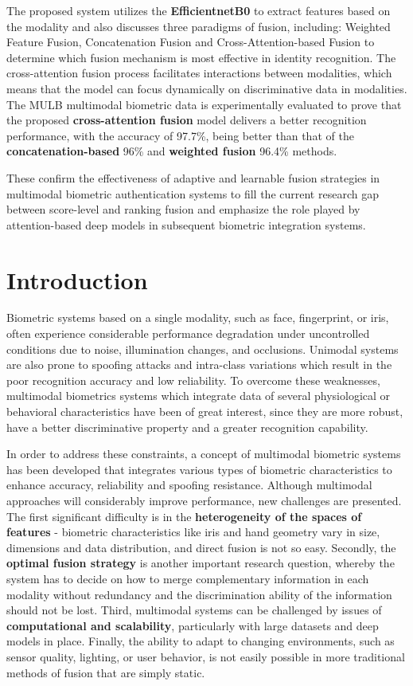\documentclass[12pt,a4paper]{report}
\begin{document}
The proposed system utilizes the \textbf{EfficientnetB0} to extract features based on the modality and also discusses three paradigms of fusion, including: Weighted Feature Fusion, Concatenation Fusion and Cross-Attention-based Fusion to determine which fusion mechanism is most effective in identity recognition. The cross-attention fusion process facilitates interactions between modalities, which means that the model can focus dynamically on discriminative data in modalities. The MULB multimodal biometric data is experimentally evaluated to prove that the proposed \textbf{cross-attention fusion} model delivers a better recognition performance, with the accuracy of 97.7\%, being better than that of the \textbf{concatenation-based} 96\% and \textbf{weighted fusion} 96.4\% methods.

These confirm the effectiveness of adaptive and learnable fusion strategies in multimodal biometric authentication systems to fill the current research gap between score-level and ranking fusion and emphasize the role played by attention-based deep models in subsequent biometric integration systems.

\section{Introduction}
Biometric systems based on a single modality, such as face, fingerprint, or iris, often experience considerable performance degradation under uncontrolled conditions due to noise, illumination changes, and occlusions. Unimodal systems are also prone to spoofing attacks and intra-class variations which result in the poor recognition accuracy and low reliability. To overcome these weaknesses, multimodal biometrics systems which integrate data of several physiological or behavioral characteristics have been of great interest, since they are more robust, have a better discriminative property and a greater recognition capability.

In order to address these constraints, a concept of multimodal biometric systems has been developed that integrates various types of biometric characteristics to enhance accuracy, reliability and spoofing resistance. Although multimodal approaches will considerably improve performance, new challenges are presented. The first significant difficulty is in the \textbf{heterogeneity of the spaces of features} - biometric characteristics like iris and hand geometry vary in size, dimensions and data distribution, and direct fusion is not so easy. Secondly, the \textbf{optimal fusion strategy} is another important research question, whereby the system has to decide on how to merge complementary information in each modality without redundancy and the discrimination ability of the information should not be lost. Third, multimodal systems can be challenged by issues of \textbf{computational and scalability}, particularly with large datasets and deep models in place. Finally, the ability to adapt to changing environments, such as sensor quality, lighting, or user behavior, is not easily possible in more traditional methods of fusion that are simply static.
\end{document}
